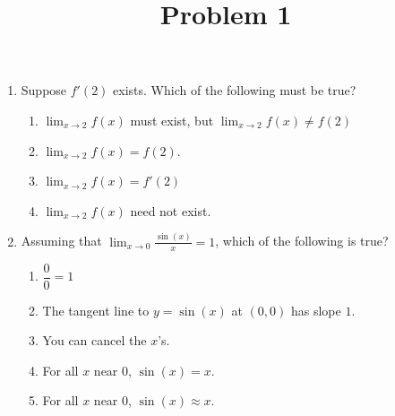 \documentclass{ximera}
\title[Problem 1]{Problem 1}
\begin{document}
\begin{abstract} \end{abstract}
\maketitle

\begin{problem}
	
	\begin{enumerate}

    \item
   
      Suppose $f'(2)$ exists. Which of the following must be true?
      \begin{enumerate}
        \item
          $\displaystyle \lim_{x \to 2} f(x)$ must exist, but $\displaystyle \lim_{x \to 2} f(x) \ne f(2)$

        \item
          $\displaystyle \lim_{x \to 2} f(x) = f(2)$.

        \item
          $\displaystyle \lim_{x \to 2} f(x) = f'(2)$

        \item
          $\displaystyle \lim_{x \to 2} f(x)$ need not exist.
      \end{enumerate}
      
\item

      Assuming that $\displaystyle \lim_{x \to 0} \frac{\sin(x)}{x} = 1$, which of the following is true?
      \begin{enumerate}
        \item $\dfrac{0}{0} = 1$
        \item The tangent line to $y = \sin(x)$ at $(0,0)$ has slope $1$.

        \item You can cancel the $x$'s.

        \item For all $x$ near $0$, $\sin(x) = x$.

        \item For all $x$ near $0$, $\sin(x) \approx x$.
      \end{enumerate}
      
\end{enumerate}

\end{problem}
\end{document}
